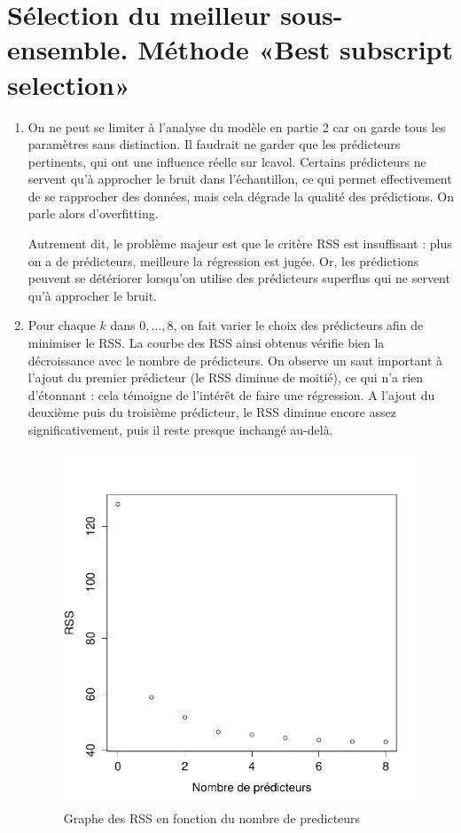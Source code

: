 \documentclass[a4paper, 12pt]{article}
\begin{document}
\section{Sélection du meilleur sous-ensemble. Méthode «Best subscript selection»}

\begin{enumerate}

\item On ne peut se limiter à l'analyse du modèle en partie 2 car on garde tous les paramètres sans distinction. Il faudrait ne garder que les prédicteurs pertinents, qui ont une influence réelle sur lcavol. Certains prédicteurs ne servent qu'à approcher le bruit dans l'échantillon, ce qui permet effectivement de se rapprocher des données, mais cela dégrade la qualité des prédictions. On parle alors d'overfitting.

Autrement dit, le problème majeur est que le critère RSS est insuffisant : plus on a de prédicteurs, meilleure la régression est jugée. Or, les prédictions peuvent se détériorer lorsqu'on utilise des prédicteurs superflus qui ne servent qu'à approcher le bruit.

\item Pour chaque $k$ dans ${0, ..., 8}$, on fait varier le choix des prédicteurs afin de minimiser le RSS. La courbe des RSS ainsi obtenus vérifie bien la décroissance avec le nombre de prédicteurs. On observe un saut important à l'ajout du premier prédicteur (le RSS diminue de moitié), ce qui n'a rien d'étonnant : cela témoigne de l'intérêt de faire une régression. A l'ajout du deuxième puis du troisième prédicteur, le RSS diminue encore assez significativement, puis il reste presque inchangé au-delà.

\begin{figure}
\begin{center}
\includegraphics[scale=0.7]{rss.pdf}
\caption{Graphe des RSS en fonction du nombre de predicteurs}
\end{center}
\end{figure}






\end{enumerate}
\end{document}
